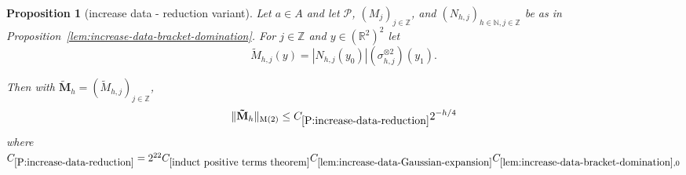 \documentclass[12pt,reqno]{amsart}
\theoremstyle{plain}
\newtheorem{proposition}[theorem]{Proposition}
\numberwithin{equation}{section}
\theoremstyle{remark}
\newcommand{\uses}[1]{}
\newcommand{\usesdefs}[1]{}
\newcommand{\Z}{{\mathbb Z}}
\newcommand{\R}{{\mathbb R}}
\newcommand{\N}{{\mathbb N}}
\begin{document}
\begin{proposition}[increase data - reduction variant]
\label{P:increase-data-reduction}\uses{lem:N-reduction,square root Gaussian difference W0,tensor Wiener,lem:increase-data-Gaussian-expansion,induct positive terms theorem,Monotonicity K,prism BL inequality,lem:increase-data-bracket-domination}\usesdefs{auto:Wiener-space-definition,multiplicatively spaced monotone sequences,geometric parameters,kernel sequences,2D Gaussians,sandwich kernel,square root Gaussian difference,s multiplier}
Let $a\in A$ and let $\mathcal P$, $(M_j)_{j\in \Z}$, and $(N_{h,j})_{h\in\N,j\in\Z}$ be as in Proposition~\ref{lem:increase-data-bracket-domination}.
 For $j\in \Z$ and $y\in (\R^2)^2$ let
    \begin{equation}\label{auto:increase-data-majorant-kernel}\tilde{M}_{h,j}(y) = |N_{h,j}(y_0)| (\sigma_{h,j}^{\otimes2})(y_1). \end{equation}

Then with $\mathbf{\tilde{M}}_h=(\tilde{M}_{h,j})_{j\in \Z}$,
    \begin{equation}\label{auto:increase-data-majorant-bound}\|\mathbf{\tilde{M}}_h\|_{\rm M(2)}\le C_{\ref{P:increase-data-reduction}} 2^{-h/4}\end{equation}
    where $C_{\ref{P:increase-data-reduction}} = 2^{22}C_{\ref{induct positive terms theorem}}C_{\ref{lem:increase-data-Gaussian-expansion}}C_{\ref{lem:increase-data-bracket-domination},0}$


\end{proposition}
\end{document}
